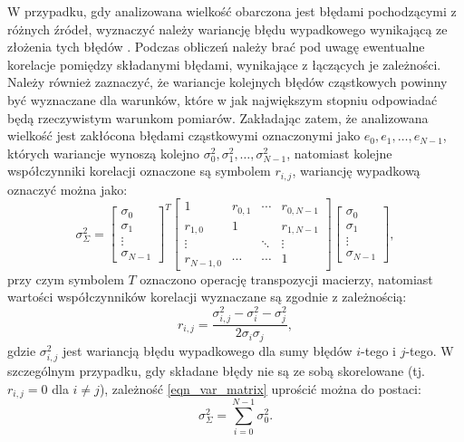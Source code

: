 W przypadku, gdy analizowana wielkość obarczona jest błędami pochodzącymi z różnych źródeł, wyznaczyć należy wariancję błędu wypadkowego wynikającą ze złożenia tych błędów \cite{wymyslo_range}. Podczas obliczeń należy brać pod uwagę ewentualne korelacje pomiędzy składanymi błędami, wynikające z łączących je zależności. Należy również zaznaczyć, że wariancje kolejnych błędów cząstkowych powinny być wyznaczane dla warunków, które w jak największym stopniu odpowiadać będą rzeczywistym warunkom pomiarów. Zakładając zatem, że analizowana wielkość jest zakłócona błędami cząstkowymi oznaczonymi jako $e_{0}, e_{1}, \hdots, e_{N-1}$, których wariancje wynoszą kolejno $\sigma_{0}^{2}, \sigma_{1}^{2}, \hdots, \sigma_{N-1}^{2}$, natomiast kolejne współczynniki korelacji \cite{jcgm_guide} oznaczone są symbolem $r_{i,j}$, wariancję wypadkową oznaczyć można jako:
\begin{equation}
\sigma_{\Sigma}^{2} =
\begin{bmatrix}
\sigma_{0} \\ \sigma_{1} \\ \vdots \\ \sigma_{N-1}
\end{bmatrix}^{T}
\begin{bmatrix}
1         & r_{0,1} & \cdots & r_{0,N-1} \\
r_{1,0}   & 1       &        & r_{1,N-1} \\
\vdots    &         & \ddots & \vdots    \\
r_{N-1,0} & \cdots  & \cdots & 1
\end{bmatrix}
\begin{bmatrix}
\sigma_{0} \\ \sigma_{1} \\ \vdots \\ \sigma_{N-1}
\end{bmatrix}
\label{eqn_var_matrix},
\end{equation}
przy czym symbolem $T$ oznaczono operację transpozycji macierzy, natomiast wartości współczynników korelacji wyznaczane są zgodnie z zależnością:
\begin{equation}
r_{i,j} = \frac{\sigma_{i,j}^{2} - \sigma_{i}^{2} - \sigma_{j}^{2}}{2 \sigma_{i} \sigma_{j}} \label{eqn_var_corr},
\end{equation}
gdzie $\sigma_{i,j}^{2}$ jest wariancją błędu wypadkowego dla sumy błędów $i$-tego i $j$-tego. W szczególnym przypadku, gdy składane błędy nie są ze sobą skorelowane (tj. $r_{i,j} = 0$ dla $i \ne j$), zależność \eqref{eqn_var_matrix} uprościć można do postaci:
\begin{equation}
\sigma_{\Sigma}^{2} = \sum _{i = 0} ^{N-1} \sigma_{0}^{2} \label{eqn_var_sum}.
\end{equation}

